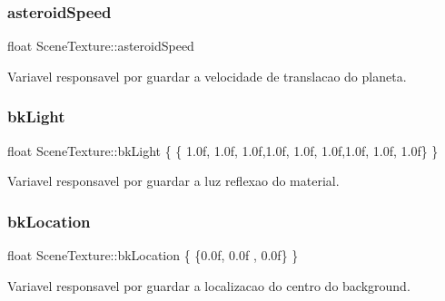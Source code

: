 \mbox{\label{class_scene_texture_a559dd4e0ca7372066b1722e4628b0ba9}} 
\subsubsection{\texorpdfstring{asteroidSpeed}{asteroidSpeed}}
{\footnotesize\ttfamily float Scene\+Texture\+::asteroid\+Speed\hspace{0.3cm}{\ttfamily [static]}}



Variavel responsavel por guardar a velocidade de translacao do planeta. 

\mbox{\label{class_scene_texture_a26f87539887244bc249e9ad4e33edb6f}} 
\subsubsection{\texorpdfstring{bkLight}{bkLight}}
{\footnotesize\ttfamily float Scene\+Texture\+::bk\+Light \{ \{ 1.\+0f, 1.\+0f, 1.\+0f,1.\+0f, 1.\+0f, 1.\+0f,1.\+0f, 1.\+0f, 1.\+0f\} \}\hspace{0.3cm}{\ttfamily [static]}}



Variavel responsavel por guardar a luz reflexao do material. 

\mbox{\label{class_scene_texture_a504efd019f30eae4e8dcbda77d48ffbb}} 
\subsubsection{\texorpdfstring{bkLocation}{bkLocation}}
{\footnotesize\ttfamily float Scene\+Texture\+::bk\+Location \{ \{0.\+0f, 0.\+0f , 0.\+0f\} \}\hspace{0.3cm}{\ttfamily [static]}}



Variavel responsavel por guardar a localizacao do centro do background. 

\mbox{\label{class_scene_texture_a7dd286541ee06b8cd2ac2f0a158b4502}} 
